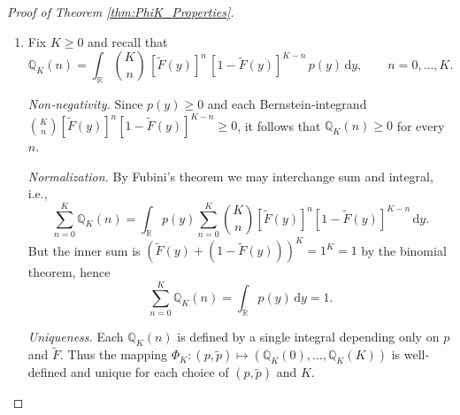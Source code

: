 \documentclass{article}
\begin{document}
\begin{proof}[Proof of Theorem \ref{thm:PhiK_Properties}]
  \smallskip           %
  \noindent
\begin{enumerate}[label=(\roman*)]
    \item Fix \(K\ge0\) and recall that
        \[
        \mathbb{Q}_K(n)
        =\int_{\mathbb{R}}\binom{K}{n}\,[\tilde F(y)]^n\,[1-\tilde F(y)]^{K-n}\,p(y)\,\mathrm{d} y,
        \qquad n=0,\dots,K.
        \]
        
        \emph{Non‐negativity.}  Since \(p(y)\ge0\) and each Bernstein‐integrand 
        \(\binom{K}{n}[\tilde F(y)]^n[1-\tilde F(y)]^{K-n}\ge0\),
        it follows that \(\mathbb{Q}_K(n)\ge0\) for every \(n\).
        
        \emph{Normalization.}  By Fubini’s theorem we may interchange sum and integral, i.e.,
        \[
        \sum_{n=0}^K \mathbb{Q}_K(n)
        =\int_{\mathbb{R}}p(y)\sum_{n=0}^K\binom{K}{n}[\tilde F(y)]^n[1-\tilde F(y)]^{K-n}\,\mathrm{d} y.
        \]
        But the inner sum is \((\tilde F(y)+(1-\tilde F(y)))^K=1^K=1\) by the binomial theorem, hence
        \[
        \sum_{n=0}^K \mathbb{Q}_K(n)
        =\int_{\mathbb{R}}p(y)\,\mathrm{d} y
        =1.
        \]
        
        \emph{Uniqueness.}  Each \(\mathbb{Q}_K(n)\) is defined by a single integral depending only on \(p\) and \(\tilde F\).  Thus the mapping 
        \(\Phi_K:(p,\tilde p)\mapsto(\mathbb{Q}_K(0),\ldots,\mathbb{Q}_K(K))\)
        is well‐defined and unique for each choice of \((p,\tilde p)\) and \(K\).
    
    
        

\end{enumerate}
\end{proof}
\end{document}
